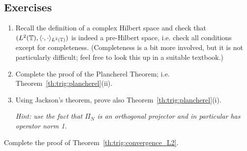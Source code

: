 



\subsection{Exercises}

\begin{exercise} \label{exr:trig:hilbert-onb}
  \begin{enumerate} \ilist
    \item Recall the definition of a complex Hilbert space and
        check that $( L^2(\mathbb{T}), \langle \cdot, \cdot \rangle_{L^2(\mathbb{T})} )$ is indeed
        a pre-Hilbert space, i.e. check all conditions except for completeness.
        (Completeness is a bit more involved, but it is not particularly
        difficult; feel free to look this up  in a suitable textbook.)

    \item Complete the proof of the Plancherel Theorem; i.e.
      Theorem~\ref{th:trig:plancherel}(ii).

    \item Using Jackson's theorem, prove also
    Theorem~\ref{th:trig:plancherel}(i).

    {\it Hint: use the fact that $\Pi_N$ is an orthogonal projector and
    in particular has operator norm 1.}
  \end{enumerate}
\end{exercise}

\begin{exercise} \label{exr:trig:convergence_L2}
  Complete the proof of Theorem~\ref{th:trig:convergence_L2}.
\end{exercise}

